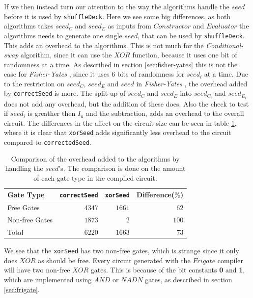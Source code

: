 \documentclass[twoside,11pt,openright]{report}
\newcommand{\FY}{\textit{Fisher-Yates} }
\newcommand{\CS}{\textit{Conditional-swap} }
\begin{document}
If we then instead turn our attention to the way the algorithms handle the $seed$ before it is used by \verb|shuffleDeck|. Here we see some big differences, as both algorithms takes $seed_C$ and $seed_E$ as inputs from $Constructor$ and $Evaluator$ the algorithms needs to generate one single $seed$, that can be used by \verb|shuffleDeck|. This adds an overhead to the algorithms. This is not much for the \CS algorithm, since it can use the $XOR$ function, because it uses one bit of randomness at a time. As described in section \ref{sec:fisher-yates} this is not the case for \FY, since it uses $6$ bits of randomness for $seed_i$ at a time. Due to the restriction on $seed_C$, $seed_E$ and $seed$ in \FY, the overhead added by \verb|correctSeed| is more. The split-up of $seed_C$ and $seed_E$ into $seed_{C_i}$ and $seed_{E_i}$ does not add any overhead, but the addition of these does. Also the check to test if $seed_i$ is greather then $I_u$ and the subtraction, adds an overhead to the overall circuit. The differences in the affect on the circuit size can be seen in table \ref{table:alg_preprocess_overhead}, where it is clear that \verb|xorSeed| adds significantly less overhead to the circuit compared to \verb|correctedSeed|. 

\begin{table}[t]
\centering
\begin{tabular}{l || r r r}
Gate Type      & \verb|correctSeed| & \verb|xorSeed| & Difference($\%$)    \\
\hline
Free Gates     & $4347$             & $1661$         &  $62$ \\
Non-free Gates & $1873$             &    $2$         & $100$ \\
\hline
Total          & $6220$             & $1663$         &  $73$
\end{tabular}
\caption{Comparison of the overhead added to the algorithms by handling the $seed$'s. The comparison is done on the amount of each gate type in the compiled circuit.}
\label{table:alg_preprocess_overhead}
\end{table}

We see that the \verb|xorSeed| has two non-free gates, which is strange since it only does $XOR$ as should be free. Every circuit generated with the $Frigate$ compiler will have two non-free $XOR$ gates. This is because of the bit constants \textbf{0} and \textbf{1}, which are implemented using $AND$ or $NADN$ gates, as described in section \ref{sec:frigate}. 

\bigskip
\end{document}
